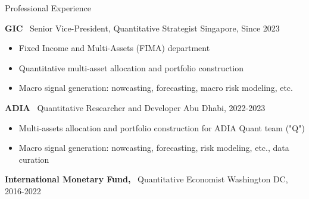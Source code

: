 \documentclass[usegeometry, 10pt, a4paper]{cv} %
\newcommand{\activite}[1]{\textbf{#1}\ }
\begin{document}
\vspace{0.5cm}


\begin{rubriquetableau}[0.95\textwidth]{Professional Experience}\\
\vspace{-0.5cm}

\activite{GIC} Senior Vice-President, Quantitative  Strategist \hfill
Singapore, Since 2023 \\ \vspace{-0.4cm}
\begin{itemize}[label={},
rightmargin=\dimexpr\linewidth-13cm-\leftmargin\relax]
\item Fixed Income and Multi-Assets (FIMA) department
\item Quantitative multi-asset allocation and portfolio construction
\item Macro signal generation: nowcasting, forecasting, macro risk modeling, etc.
 \end{itemize}
 
\vspace{0.2cm}


\activite{ADIA} Quantitative  Researcher and Developer  \hfill
Abu Dhabi, 2022-2023 \\ \vspace{-0.2cm}
\begin{itemize}[label={},
rightmargin=\dimexpr\linewidth-13cm-\leftmargin\relax]
\item Multi-assets  allocation and  portfolio  construction for ADIA Quant team ("Q")
\item Macro signal generation: nowcasting, forecasting, risk modeling, etc., data curation
 \end{itemize}
 
\vspace{0.2cm}

\activite{International Monetary Fund,} Quantitative Economist \hfill Washington DC, 2016-2022 \\
\vspace{-0.2cm}


\end{rubriquetableau}
\end{document}
